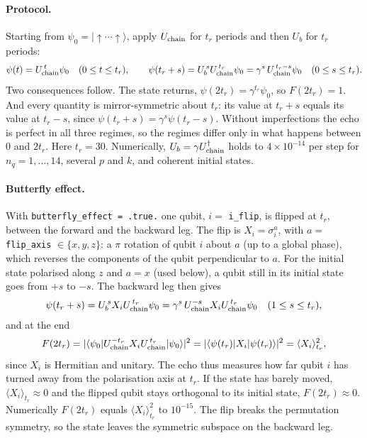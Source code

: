 \documentclass[11pt,a4paper]{article}
\begin{document}
\paragraph{Protocol.}
Starting from $\psi_0=|{\uparrow\cdots\uparrow}\rangle$, apply $U_{\rm chain}$ for $t_r$ periods and then $U_b$ for
$t_r$ periods:
\begin{equation}
  \psi(t) = U_{\rm chain}^{\,t}\psi_0\quad (0\le t\le t_r),\qquad
  \psi(t_r+s) = U_b^{\,s}U_{\rm chain}^{\,t_r}\psi_0 = \gamma^s\,U_{\rm chain}^{\,t_r-s}\psi_0
  \quad(0\le s\le t_r).
\end{equation}
Two consequences follow. The state returns, $\psi(2t_r)=\gamma^{t_r}\psi_0$, so $F(2t_r)=1$. And every quantity is
mirror-symmetric about $t_r$: its value at $t_r+s$ equals its value at $t_r-s$, since $\psi(t_r+s)=\gamma^s\psi(t_r-s)$.
Without imperfections the echo is perfect in all three regimes, so the regimes differ only in what happens between
$0$ and $2t_r$. Here $t_r=30$. Numerically, $U_b=\gamma U_{\rm chain}^\dagger$ holds to $4\times10^{-14}$ per step for
$n_q=1,\dots,14$, several $p$ and $k$, and coherent initial states.

\paragraph{Butterfly effect.}
With \texttt{butterfly\_effect = .true.} one qubit, $i=$ \texttt{i\_flip}, is flipped at $t_r$, between the forward
and the backward leg. The flip is $X_i=\sigma^a_i$, with $a=$ \texttt{flip\_axis} $\in\{x,y,z\}$: a $\pi$ rotation of
qubit $i$ about $a$ (up to a global phase), which reverses the components of the qubit perpendicular to $a$. For the
initial state polarised along $z$ and $a=x$ (used below), a qubit still in its initial state goes from $+s$ to $-s$.
The backward leg then gives
\begin{equation}
  \psi(t_r+s) = U_b^{\,s}X_iU_{\rm chain}^{\,t_r}\psi_0 = \gamma^s\,U_{\rm chain}^{-s}X_iU_{\rm chain}^{\,t_r}\psi_0
  \quad(1\le s\le t_r),
\end{equation}
and at the end
\begin{equation}
  F(2t_r) = |\langle\psi_0|U_{\rm chain}^{-t_r}X_iU_{\rm chain}^{\,t_r}|\psi_0\rangle|^2
  = |\langle\psi(t_r)|X_i|\psi(t_r)\rangle|^2 = \langle X_i\rangle_{t_r}^2 ,
\end{equation}
since $X_i$ is Hermitian and unitary. The echo thus measures how far qubit $i$ has turned away from the polarisation
axis at $t_r$. If the state has barely moved, $\langle X_i\rangle_{t_r}\approx0$ and the flipped qubit stays orthogonal
to its initial state, $F(2t_r)\approx0$. Numerically $F(2t_r)$ equals $\langle X_i\rangle_{t_r}^2$ to $10^{-15}$. The
flip breaks the permutation symmetry, so the state leaves the symmetric subspace on the backward leg.
\end{document}

